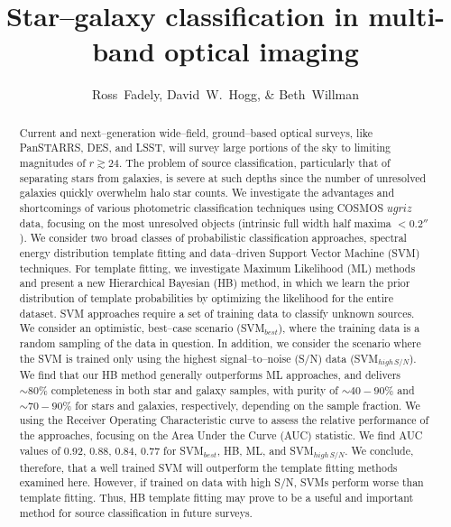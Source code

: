 \documentclass[12pt,preprint]{aastex}
\begin{document}
\title{Star--galaxy classification in multi-band optical imaging}
\author{Ross~Fadely,
        David~W.~Hogg,
        \& Beth~Willman}



%
%
\begin{abstract}

  Current and next--generation wide--field, ground--based optical
  surveys, like PanSTARRS, DES, and LSST, will survey large portions
  of the sky to limiting magnitudes of $r \gtrsim 24$.  The problem of
  source classification, particularly that of separating stars from
  galaxies, is severe at such depths since the number of unresolved
  galaxies quickly overwhelm halo star counts.  We investigate the
  advantages and shortcomings of various photometric classification
  techniques using COSMOS $ugriz$ data, focusing on the most
  unresolved objects (intrinsic full width half maxima $<0.2''$).  We
  consider two broad classes of probabilistic classification
  approaches, spectral energy distribution template fitting and
  data--driven Support Vector Machine (SVM) techniques.  For template
  fitting, we investigate Maximum Likelihood (ML) methods and present
  a new Hierarchical Bayesian (HB) method, in which we learn the prior
  distribution of template probabilities by optimizing the likelihood
  for the entire dataset.  SVM approaches require a set of training
  data to classify unknown sources.  We consider an optimistic,
  best--case scenario (SVM$_{best}$), where the training data is a
  random sampling of the data in question.  In addition, we consider
  the scenario where the SVM is trained only using the highest
  signal--to--noise (S/N) data (SVM$_{high\,S/N}$).  We find that our
  HB method generally outperforms ML approaches, and delivers
  $\sim80\%$ completeness in both star and galaxy samples, with purity
  of $\sim40-90\%$ and $\sim70-90\%$ for stars and galaxies,
  respectively, depending on the sample fraction.  We using the
  Receiver Operating Characteristic curve to assess the relative
  performance of the approaches, focusing on the Area Under the Curve
  (AUC) statistic.  We find AUC values of 0.92, 0.88, 0.84, 0.77 for
  SVM$_{best}$, HB, ML, and SVM$_{high\,S/N}$.  We conclude,
  therefore, that a well trained SVM will outperform the template
  fitting methods examined here.  However, if trained on data with
  high S/N, SVMs perform worse than template fitting.  Thus, HB
  template fitting may prove to be a useful and important method for
  source classification in future surveys.

\end{abstract}
\end{document}
